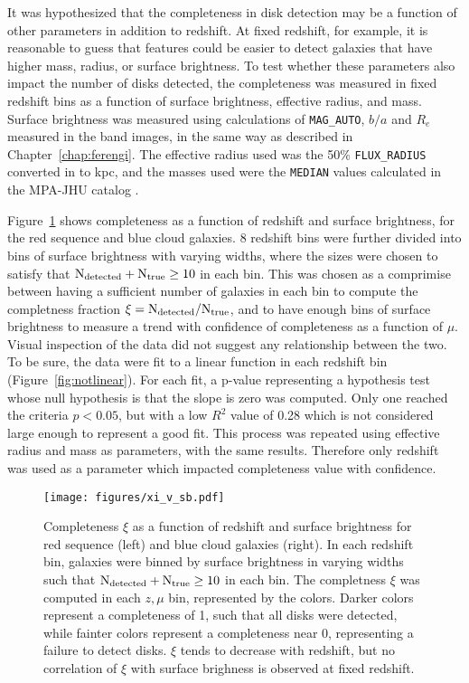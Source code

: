 It was hypothesized that the completeness in disk detection may be a function of other parameters in addition to redshift. At fixed redshift, for example, it is reasonable to guess that features could be easier to detect galaxies that have higher mass, radius, or surface brightness. To test whether these parameters also impact the number of disks detected, the completeness was measured in fixed redshift bins as a function of surface brightness, effective radius, and mass. Surface brightness was measured using \sextractor{} calculations of {\tt MAG\_AUTO}, $b/a$ and $R_{e}$ measured in the \Iband{} band images, in the same way as described in Chapter~\ref{chap:ferengi}. The effective radius used was the 50\% {\tt FLUX\_RADIUS} converted in to kpc, and the masses used were the {\tt MEDIAN} values calculated in the MPA-JHU catalog \citep{Kauffmann2003b}.

Figure~\ref{fig:xi_v_sb} shows completeness as a function of redshift and surface brightness, for the red sequence and blue cloud galaxies. 8 redshift bins were further divided into bins of surface brightness with varying widths, where the sizes were chosen to satisfy that $\rm N_{detected} + N_{true} \ge 10$ in each bin. This was chosen as a comprimise between having a sufficient number of galaxies in each bin to compute the completness fraction $\rm \xi = N_{detected}/N_{true}$, and to have enough bins of surface brightness to measure a trend with confidence of completeness as a function of $\mu$. Visual inspection of the data did not suggest any relationship between the two. To be sure, the data were fit to a linear function in each redshift bin (Figure~\ref{fig:notlinear}). For each fit, a p-value representing a hypothesis test whose null hypothesis is that the slope is zero was computed. Only one reached the criteria $p<0.05$, but with a low $R^{2}$ value of 0.28 which is not considered large enough to represent a good fit. This process was repeated using effective radius and mass as parameters, with the same results. Therefore only redshift was used as a parameter which impacted completeness value with confidence.  


\begin{figure}
\centering
\texttt{[image: figures/xi\_v\_sb.pdf]}
\caption{Completeness $\xi$ as a function of redshift and surface brightness for red sequence (left) and blue cloud galaxies (right). In each redshift bin, galaxies were binned by surface brightness in varying widths such that $\rm N_{detected} + N_{true} \ge 10$ in each bin. The completness $\xi$ was computed in each $z,\mu$ bin, represented by the colors. Darker colors represent a completeness of 1, such that all disks were detected, while fainter colors represent a completeness near 0, representing a failure to detect disks. $\xi$ tends to decrease with redshift, but no correlation of $\xi$ with surface brighness is observed at fixed redshift.}
\label{fig:xi_v_sb}
\end{figure}

